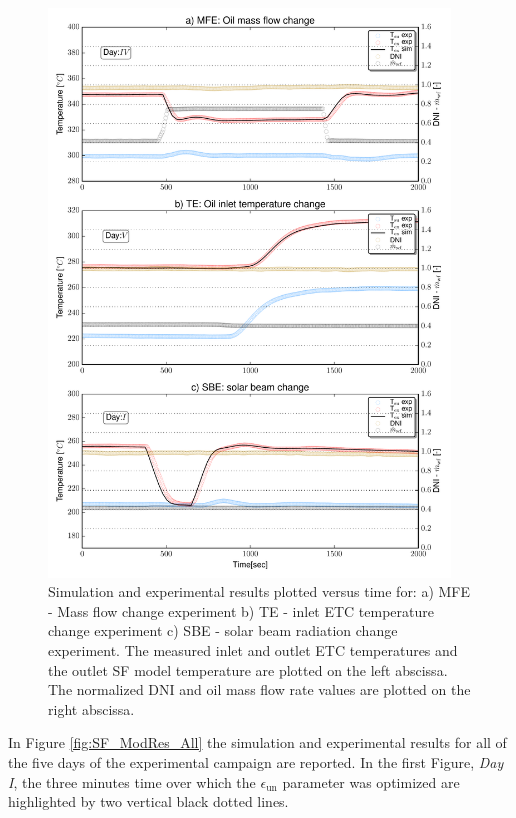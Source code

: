 \documentclass[final,3p,times,review]{elsarticle}
\begin{document}
\begin{figure}[h!]
\centering
\includegraphics[width=0.95\textwidth]{Figures/_MassFlowChange.pdf}
\caption{Simulation and experimental results plotted versus time for: a) MFE - Mass flow change experiment  b) TE - inlet ETC temperature change experiment c) SBE - solar beam radiation change experiment. The measured inlet and outlet ETC temperatures and the outlet SF model temperature are plotted on the left abscissa. The normalized DNI and oil mass flow rate values are plotted on the right abscissa.}
\label{fig:SF_ModRes_Zoomed}
\end{figure}
%
In Figure \ref{fig:SF_ModRes_All} the simulation and experimental results for all of the five days of the experimental campaign are reported. In the first Figure, \textit{Day I}, the three minutes time over which the $\epsilon_\mathrm{un}$ parameter was optimized are highlighted by two vertical black dotted lines.
%
\end{document}
